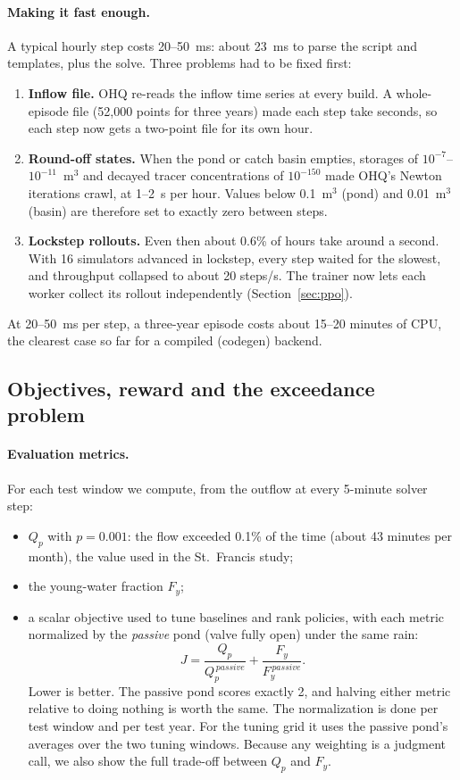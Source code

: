 \paragraph{Making it fast enough.} A typical hourly step costs 20--50~ms:
about 23~ms to parse the script and templates, plus the solve. Three
problems had to be fixed first:
\begin{enumerate}\itemsep1pt
\item \textbf{Inflow file.} OHQ re-reads the inflow time series at every
build. A whole-episode file (52{,}000 points for three years) made each
step take seconds, so each step now gets a two-point file for its own hour.
\item \textbf{Round-off states.} When the pond or catch basin empties,
storages of $10^{-7}$--$10^{-11}$~m$^3$ and decayed tracer concentrations
of $10^{-150}$ made OHQ's Newton iterations crawl, at 1--2~s per hour.
Values below 0.1~m$^3$ (pond) and 0.01~m$^3$ (basin) are therefore set to
exactly zero between steps.
\item \textbf{Lockstep rollouts.} Even then about 0.6\% of hours take
around a second. With 16 simulators advanced in lockstep, every step
waited for the slowest, and throughput collapsed to about 20 steps/s. The
trainer now lets each worker collect its rollout independently
(Section~\ref{sec:ppo}).
\end{enumerate}
At 20--50~ms per step, a three-year episode costs about 15--20 minutes of
CPU, the clearest case so far for a compiled (codegen) backend.

\subsection{Objectives, reward and the exceedance problem}
\paragraph{Evaluation metrics.} For each test window we compute, from the
outflow at every 5-minute solver step:
\begin{itemize}\itemsep1pt
\item $Q_p$ with $p=0.001$: the flow exceeded 0.1\% of the time (about 43
minutes per month), the value used in the St.~Francis study;
\item the young-water fraction $F_y$;
\item a scalar objective used to tune baselines and rank policies, with
each metric normalized by the \emph{passive} pond (valve fully open) under
the same rain:
\[
J=\frac{Q_p}{Q_p^{\,passive}}+\frac{F_y}{F_y^{\,passive}} .
\]
Lower is better. The passive pond scores exactly 2, and halving either
metric relative to doing nothing is worth the same. The normalization is
done per test window and per test year. For the tuning grid it uses the
passive pond's averages over the two tuning windows. Because any weighting
is a judgment call, we also show the full trade-off between $Q_p$ and
$F_y$.
\end{itemize}

